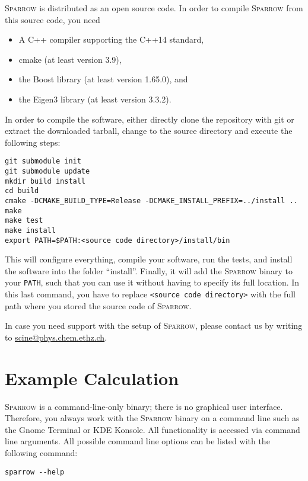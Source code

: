 \documentclass[]{tufte-book}
\begin{document}
\textsc{Sparrow} is distributed as an open source code. In order to compile \textsc{Sparrow} from this source code, you need
\begin{itemize}
 \item A C++ compiler supporting the C++14 standard,
 \item cmake (at least version 3.9),
 \item the Boost library (at least version 1.65.0), and
 \item the Eigen3 library (at least version 3.3.2).
\end{itemize}
In order to compile the software, either directly clone the repository with git or extract the downloaded tarball, change
to the source directory and execute the following steps:
\begin{verbatim}
git submodule init
git submodule update
mkdir build install
cd build
cmake -DCMAKE_BUILD_TYPE=Release -DCMAKE_INSTALL_PREFIX=../install ..
make
make test
make install
export PATH=$PATH:<source code directory>/install/bin
\end{verbatim}
This will configure everything, compile your software, run the tests, and install the software
into the folder ``install''. Finally, it will add the \textsc{Sparrow} binary to your \texttt{PATH}, such that you can use
it without having to specify its full location. In this last command, you have to replace \texttt{<source code directory>}
with the full path where you stored the source code of \textsc{Sparrow}.

In case you need support with the setup of \textsc{Sparrow}, please contact us by writing to \href{scine@phys.chem.ethz.ch}{scine@phys.chem.ethz.ch}.



\chapter{Example Calculation}

\textsc{Sparrow} is a command-line-only binary; there is no graphical user interface. Therefore, you always work with the
\textsc{Sparrow} binary on a command line such as the Gnome Terminal or KDE Konsole.
All functionality is accessed via command line arguments. All possible command line options can be listed with the following command:
\begin{verbatim}
sparrow --help
\end{verbatim}
\end{document}
